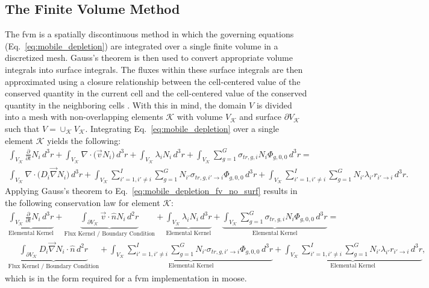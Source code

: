 \subsection{The Finite Volume Method}
\label{solver:depletion:fv}

The \acrshort{fvm} is a spatially discontinuous method in which the governing equations (Eq.~\ref{eq:mobile_depletion}) are integrated over a single finite volume in a discretized mesh. Gauss's theorem is then used to convert appropriate volume integrals into surface integrals. The fluxes within these surface integrals are then approximated using a closure relationship between the cell-centered value of the conserved quantity in the current cell and the cell-centered value of the conserved quantity in the neighboring cells \cite{finite_volume_methods}. With this in mind, the domain $V$ is divided into a mesh with non-overlapping elements $\mathcal{K}$ with volume $V_{\mathcal{K}}$ and surface $\partial V_{\mathcal{K}}$ such that $V = \cup_{\mathcal{K}} V_{\mathcal{K}}$. Integrating Eq.~\ref{eq:mobile_depletion} over a single element $\mathcal{K}$ yields the following:
\begin{multline}\label{eq:mobile_depletion_fv_no_surf}
    \int_{V_{\mathcal{K}}}\frac{\partial}{\partial t}N_{i}\,d^{3}r
    + \int_{V_{\mathcal{K}}}\nabla\cdot\Big(\vec{v}N_{i}\Big)\,d^{3}r
    + \int_{V_{\mathcal{K}}}\lambda_{i}N_{i}\,d^{3}r
    + \int_{V_{\mathcal{K}}}\sum_{g = 1}^{G}\sigma_{tr,g,i}N_{i}\Phi_{g, 0, 0}\,d^{3}r = \\
    \int_{V_{\mathcal{K}}}\nabla\cdot\Big(D_{i}\vec{\nabla}N_{i}\Big)\,d^{3}r
    + \int_{V_{\mathcal{K}}}\sum_{i' = 1,i' \neq i}^{I}\sum_{g = 1}^{G}N_{i'}\sigma_{tr,g,i'\rightarrow i}\Phi_{g, 0, 0}\,d^{3}r
    + \int_{V_{\mathcal{K}}}\sum_{i' = 1,i' \neq i}^{I}\sum_{g = 1}^{G}N_{i'}\lambda_{i'}r_{i'\rightarrow i}\,d^{3}r
    \text{.}
\end{multline}
Applying Gauss's theorem to Eq.~\ref{eq:mobile_depletion_fv_no_surf} results in the following conservation law for element $\mathcal{K}$:
\begin{multline}\label{eq:mobile_depletion_fv}
    \underbrace{\int_{V_{\mathcal{K}}}\frac{\partial}{\partial t}N_{i}\,d^{3}r}_{\text{Elemental Kernel}}
    + \underbrace{\int_{\partial V_{\mathcal{K}}}\vec{v}\cdot\hat{n}N_{i}\,d^{2}r}_{\text{Flux Kernel / Boundary Condition}}
    + \underbrace{\int_{V_{\mathcal{K}}}\lambda_{i}N_{i}\,d^{3}r}_{\text{Elemental Kernel}}
    + \underbrace{\int_{V_{\mathcal{K}}}\sum_{g = 1}^{G}\sigma_{tr,g,i}N_{i}\Phi_{g, 0, 0}\,d^{3}r}_{\text{Elemental Kernel}} = \\
    \underbrace{\int_{\partial V_{\mathcal{K}}}D_{i}\vec{\nabla}N_{i}\cdot\hat{n}\,d^{2}r}_{\text{Flux Kernel / Boundary Condition}}
    + \underbrace{\int_{V_{\mathcal{K}}}\sum_{i' = 1,i' \neq i}^{I}\sum_{g = 1}^{G}N_{i'}\sigma_{tr,g,i'\rightarrow i}\Phi_{g, 0, 0}\,d^{3}r}_{\text{Elemental Kernel}}
    + \underbrace{\int_{V_{\mathcal{K}}}\sum_{i' = 1,i' \neq i}^{I}\sum_{g = 1}^{G}N_{i'}\lambda_{i'}r_{i'\rightarrow i}\,d^{3}r}_{\text{Elemental Kernel}}
    \text{,}
\end{multline}
which is in the form required for a \acrshort{fvm} implementation in \acrshort{moose}. 

